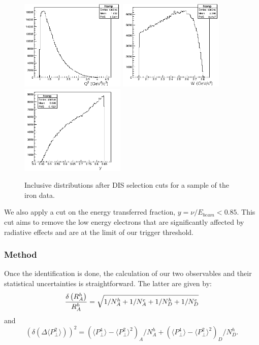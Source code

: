 \begin{figure}[tbp]
\centering
\includegraphics[width=5cm] {answer-fig/DIS-Q2.png} 
\includegraphics[width=5cm] {answer-fig/DIS-w.png} 
\includegraphics[width=5cm] {answer-fig/DIS-y.png} 
\caption {Inclusive distributions after DIS selection cuts for a sample of the iron
data.}
\label{DISKine}
\end{figure}

We also apply a cut on the energy transferred fraction, $y = \nu/E_{beam} < 0.85$. This cut aims to remove the low energy electrons that are significantly affected by radiative effects and are at the limit of our trigger threshold.

\subsubsection{Method}
\label{RatioCalc}

Once the identification is done, the calculation of our two observables and their statistical uncertainties is straightforward. The latter are given by:
\begin{equation}
\label{eq:MRError}
{\delta \left ( R_A^h \right ) \over R_A^h} = \sqrt{ 1 /N_A^h + 1/ N_A^e +1/N_D^h + 1/N_D^e}
\end{equation}
and
\begin{equation}
\label{eq:DPtError}
\left ( \delta \left ( \Delta \langle P_\perp^2 \rangle \right ) \right )^2 = 
   \left ({\langle P_\perp^4 \rangle - \langle P_\perp^2 \rangle ^2}\right )_A / N_A^h
 + \left ({\langle P_\perp^4 \rangle - \langle P_\perp^2 \rangle ^2}\right )_D / N_D^h.
\end{equation}

